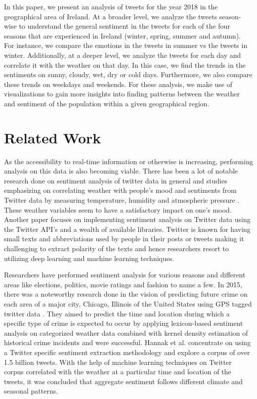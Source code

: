 \documentclass[a4paper,10pt]{article}
\begin{document}
    In this paper, we present an analysis of tweets for the year 2018 in the geographical area of Ireland. At a broader level, we analyze the tweets season-wise to understand the general sentiment in the tweets for each of the four seasons that are experienced in Ireland (winter, spring, summer and autumn). For instance, we compare the emotions in the tweets in summer vs the tweets in winter. Additionally, at a deeper level, we analyze the tweets for each day and correlate it with the weather on that day. In this case, we find the trends in the sentiments on sunny, cloudy, wet, dry or cold days. Furthermore, we also compare these trends on weekdays and weekends. For these analysis, we make use of visualizations to gain more insights into finding patterns between the weather and sentiment of the population within a given geographical region.


    \section{Related Work}

    As the accessibility to real-time information or otherwise is increasing, performing analysis on this data is also becoming viable. There has been a lot of notable research done on sentiment analysis of twitter data in general and studies emphasizing on correlating weather with people’s mood and sentiments from Twitter data by measuring temperature, humidity and atmospheric pressure . These weather variables seem to have a satisfactory impact on one’s mood. Another paper  focuses on implementing sentiment analysis on Twitter data using the Twitter API’s and a wealth of available libraries. Twitter is known for having small texts and abbreviations used by people in their posts or tweets making it challenging to extract polarity of the texts and hence researchers resort to utilizing deep learning and machine learning techniques.
    
    Researchers have performed sentiment analysis for various reasons and different areas like elections, politics, movie ratings and fashion to name a few. In 2015, there was a noteworthy research done in the vision of predicting future crime on each area of a major city, Chicago, Illinois of the United States using GPS tagged twitter data . They aimed to predict the time and location during which a specific type of crime is expected to occur by applying lexicon-based sentiment analysis on categorized weather data combined with kernel density estimation of historical crime incidents and were successful. Hannak et al.  concentrate on using a Twitter specific sentiment extraction methodology and explore a corpus of over 1.5 billion tweets. With the help of machine learning techniques on Twitter corpus correlated with the weather at a particular time and location of the tweets, it was concluded that aggregate sentiment follows different climate and seasonal patterns.
\end{document}
